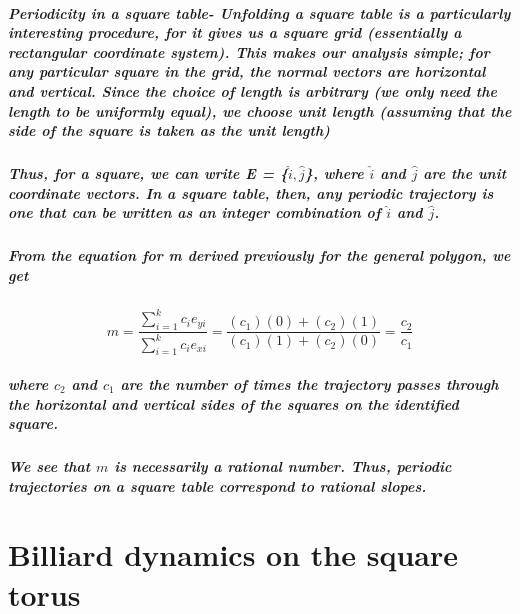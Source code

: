 \documentclass{report}
\begin{document}
\paragraph{Periodicity in a square table- Unfolding a square table is a particularly interesting procedure, for it gives us a square grid (essentially a rectangular coordinate system). This makes our analysis simple; for any particular square in the grid, the normal vectors are horizontal and vertical. Since the choice of length is arbitrary (we only need the length to be uniformly equal), we choose unit length (assuming that the side of the square is taken as the unit length)}

\paragraph{Thus, for a square, we can write E = \{$\hat{i},\hat{j}$\}, where $\hat{i}$ and $\hat{j}$ are the unit coordinate vectors. In a square table, then, any periodic trajectory is one that can be written as an integer combination of $\hat{i}$ and $\hat{j}$.}

\paragraph{From the equation for m derived previously for the general polygon, we get}

\begin{equation}
m=\frac{\sum_{i=1}^k  c_ie_{yi} }{\sum_{i=1}^k  c_ie_{xi} }=\frac{(c_1)(0)+(c_2)(1)}{(c_1)(1)+(c_2)(0)}=\frac{c_2}{c_1}
\end{equation}

\paragraph{where $c_2$ and $c_1$ are the number of times the trajectory passes through the horizontal and vertical sides of the squares on the identified square.}

\paragraph{We see that $m$ is necessarily a rational number. Thus, periodic trajectories on a square table correspond to rational slopes.}






\chapter{Billiard dynamics on the square torus}
\end{document}
